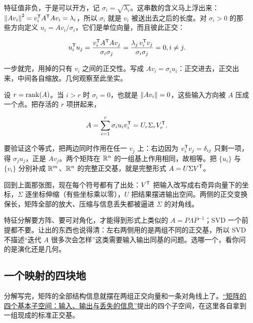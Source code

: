 特征值非负，于是可以开方，记 \(\sigma_i=\sqrt{\lambda_i}\)。这串数的含义马上浮出来：\(\left\lVert Av_i\right\rVert^2=v_i^{\mathsf{T}}A^{\mathsf{T}}Av_i=\lambda_i\)，所以 \(\sigma_i\) 就是 \(v_i\) 被送出去之后的长度。对 \(\sigma_i>0\) 的那些方向定义 \(u_i=Av_i/\sigma_i\)，它们是单位向量，而且彼此正交：

\[
u_i^{\mathsf{T}}u_j
=\frac{v_i^{\mathsf{T}}A^{\mathsf{T}}Av_j}{\sigma_i\sigma_j}
=\frac{\lambda_j\,v_i^{\mathsf{T}}v_j}{\sigma_i\sigma_j}=0,
\space i\ne j .
\]

一步就完，用掉的只有 \(v_i\) 之间的正交性。写成 \(Av_i=\sigma_iu_i\)：正交进去，正交出来，中间各自缩放。几何观察至此坐实。

设 \(r=\operatorname{rank}(A)\)。当 \(i>r\) 时 \(\sigma_i=0\)，也就是 \(\left\lVert Av_i\right\rVert=0\)，这些输入方向被 \(A\) 压成一个点。把存活的 \(r\) 项拼起来，

\[
A=\sum_{i=1}^{r}\sigma_i u_i v_i^{\mathsf{T}}=U_r\Sigma_r V_r^{\mathsf{T}}.
\]

要验证这个等式，把两边同时作用在任一 \(v_j\) 上：右边因为 \(v_i^{\mathsf{T}}v_j=\delta_{ij}\) 只剩一项，得 \(\sigma_j u_j\)，正是 \(Av_j\)。两个矩阵在 \(\mathbb{R}^n\) 的一组基上作用相同，故相等。把 \(\{u_i\}\) 与 \(\{v_i\}\) 分别补成 \(\mathbb{R}^m\)、\(\mathbb{R}^n\) 的完整正交基，就是完整形式 \(A=U\Sigma V^{\mathsf{T}}\)。

回到上面那张图，现在每个符号都有了出处：\(V^{\mathsf{T}}\) 把输入改写成右奇异向量下的坐标，\(\Sigma\) 逐坐标伸缩（有些坐标乘以零），\(U\) 把结果摆进输出空间。两侧的正交变换保长，矩阵全部的放大、压缩与信息丢失都被逼进 \(\Sigma\) 的对角线。

特征分解要方阵、要可对角化，才能得到形式上类似的 \(A=P\Lambda P^{-1}\)；SVD 一个前提都不要。让出的东西也说得清：左右两侧用的是两组不同的正交基，所以 SVD 不描述``迭代 \(A\) 很多次会怎样''这类需要输入输出同基的问题。选哪一个，看你问的是演化还是几何。

\subsection{一个映射的四块地}

分解写完，矩阵的全部结构信息就摆在两组正交向量和一条对角线上了。\hyperref[sec:03-Linear-Algebra/02-Vector-Spaces/03]{``矩阵的四个基本子空间：输入、输出与丢失的信息''}提出的四个子空间，在这里各自拿到一组现成的标准正交基。

